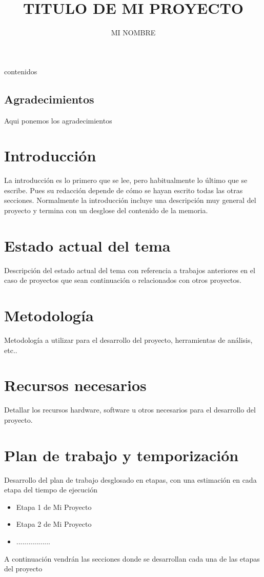 \documentclass[12pt,a4paper,spanish]{book}
\begin{document}
contenidos
\title{TITULO DE MI PROYECTO}
\author{MI NOMBRE}
\date{}
\maketitle
\tableofcontents
\newpage
\thispagestyle{empty}
\section*{Agradecimientos}
 Aqui ponemos los agradecimientos
\chapter{Introducci\'on}
 La introducción es lo primero que se lee, pero habitualmente lo
último que se escribe. Pues su redacción
 depende de cómo se hayan escrito todas las otras secciones.
Normalmente la introducción incluye una
 descripción muy general del proyecto y termina con un desglose del
contenido de la memoria.
\chapter{Estado actual del tema}
 Descripción del estado actual del tema con referencia a trabajos
anteriores en el caso de proyectos que
 sean continuación o relacionados con otros proyectos.
\chapter{Metodología}
 Metodología a utilizar para el desarrollo del proyecto,
herramientas de análisis, etc..
\chapter{Recursos necesarios}
 Detallar los recursos hardware, software u otros necesarios para el
desarrollo del proyecto.
\chapter{Plan de trabajo y temporización}
Desarrollo del plan de trabajo desglosado en etapas, con una
estimación en cada etapa del tiempo de ejecución
\begin{itemize}
\item Etapa 1 de Mi Proyecto
\item Etapa 2 de Mi Proyecto
\item .................
\end{itemize}
A continuación vendrán las secciones donde se desarrollan cada una de
las etapas del proyecto
\end{document}
